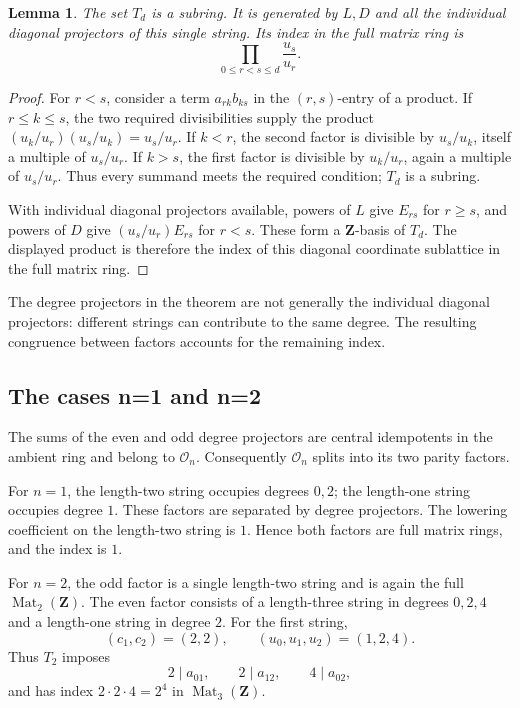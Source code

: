 \documentclass[11pt,a4paper]{article}
\newtheorem{lemma}[theorem]{Lemma}
\theoremstyle{remark}
\begin{document}
\begin{lemma}
\label{sl:triangular-order}
The set \(T_d\) is a subring.  It is generated by \(L,D\) and all
the individual diagonal projectors of this single string.  Its
index in the full matrix ring is
\[
\prod_{0\le r<s\le d}\frac{u_s}{u_r}.
\]
\end{lemma}

\begin{proof}
For \(r<s\), consider a term \(a_{rk}b_{ks}\) in the
\((r,s)\)-entry of a product.  If \(r\le k\le s\), the two required
divisibilities supply the product
\((u_k/u_r)(u_s/u_k)=u_s/u_r\).  If \(k<r\), the second factor is
divisible by \(u_s/u_k\), itself a multiple of \(u_s/u_r\).
If \(k>s\), the first factor is divisible by \(u_k/u_r\), again
a multiple of \(u_s/u_r\).  Thus every summand meets the required
condition; \(T_d\) is a subring.

With individual diagonal projectors available, powers of \(L\)
give \(E_{rs}\) for \(r\ge s\), and powers of \(D\) give
\((u_s/u_r)E_{rs}\) for \(r<s\).  These form a
\(\mathbf Z\)-basis of \(T_d\).  The displayed product is therefore
the index of this diagonal coordinate sublattice in the full
matrix ring.
\end{proof}

The degree projectors in the theorem are not generally the
individual diagonal projectors: different strings can contribute
to the same degree.  The resulting congruence between factors
accounts for the remaining index.

\subsection{The cases n=1 and n=2}

The sums of the even and odd degree projectors are central
idempotents in the ambient ring and belong to \(\mathcal O_n\).
Consequently \(\mathcal O_n\) splits into its two parity factors.

For \(n=1\), the length-two string occupies degrees \(0,2\);
the length-one string occupies degree \(1\).  These factors are
separated by degree projectors.  The lowering coefficient on
the length-two string is \(1\).  Hence both factors are full
matrix rings, and the index is \(1\).

For \(n=2\), the odd factor is a single length-two string and
is again the full \(\operatorname{Mat}_2(\mathbf Z)\).
The even factor consists of a length-three string in degrees
\(0,2,4\) and a length-one string in degree \(2\).
For the first string,
\[
(c_1,c_2)=(2,2),\qquad (u_0,u_1,u_2)=(1,2,4).
\]
Thus \(T_2\) imposes
\[
2\mid a_{01},\qquad 2\mid a_{12},\qquad 4\mid a_{02},
\]
and has index \(2\cdot2\cdot4=2^4\) in
\(\operatorname{Mat}_3(\mathbf Z)\).
\end{document}

